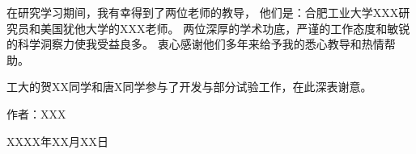 
\begin{acknowledgements}

在研究学习期间，我有幸得到了两位老师的教导，
他们是：合肥工业大学XXX研究员和美国犹他大学的XXX老师。
两位深厚的学术功底，严谨的工作态度和敏锐的科学洞察力使我受益良多。
衷心感谢他们多年来给予我的悉心教导和热情帮助。

工大的贺XX同学和唐X同学参与了开发与部分试验工作，在此深表谢意。


\begin{flushright}
作者：XXX

XXXX年XX月XX日
\end{flushright}

\end{acknowledgements}
